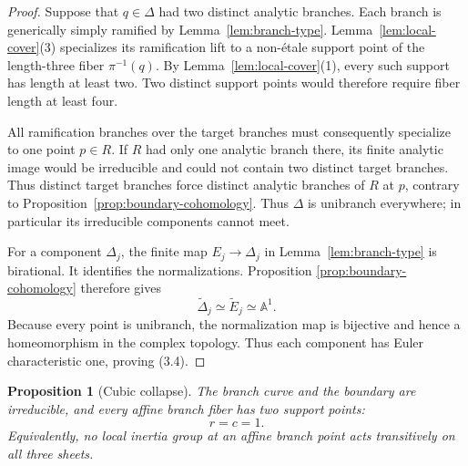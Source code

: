 \documentclass[11pt]{article}
\newtheorem{proposition}[theorem]{Proposition}
\theoremstyle{definition}
\theoremstyle{remark}
\newcommand{\A}{\mathbb A}
\begin{document}
\begin{proof}
Suppose that \(q\in\Delta\) had two distinct analytic branches.  Each
branch is generically simply ramified by Lemma~\ref{lem:branch-type}.
Lemma~\ref{lem:local-cover}(3) specializes its ramification lift to a
non-\'etale support point of the length-three fiber \(\pi^{-1}(q)\).
By Lemma~\ref{lem:local-cover}(1), every such support has length at
least two.  Two distinct support points would therefore require fiber
length at least four.

All ramification branches over the target branches must consequently
specialize to one point \(p\in R\).  If \(R\) had only one analytic
branch there, its finite analytic image would be irreducible and could
not contain two distinct target branches.  Thus distinct target
branches force distinct analytic branches of \(R\) at \(p\), contrary to
Proposition~\ref{prop:boundary-cohomology}.  Thus \(\Delta\) is
unibranch everywhere; in particular its irreducible components cannot
meet.

For a component \(\Delta_j\), the finite map
\(E_j\to\Delta_j\) in Lemma~\ref{lem:branch-type} is birational.
It identifies the normalizations.  Proposition
\ref{prop:boundary-cohomology} therefore gives
\[
 \widetilde\Delta_j\simeq\widetilde E_j\simeq\A^1.
\]
Because every point is unibranch, the normalization map is bijective
and hence a homeomorphism in the complex topology.  Thus each component
has Euler characteristic one, proving (3.4).
\end{proof}

\begin{proposition}[Cubic collapse]\label{prop:collapse}
The branch curve and the boundary are irreducible, and every affine
branch fiber has two support points:
\[
 r=c=1.
 \tag{3.5}
\]
Equivalently, no local inertia group at an affine branch point acts
transitively on all three sheets.
\end{proposition}
\end{document}
